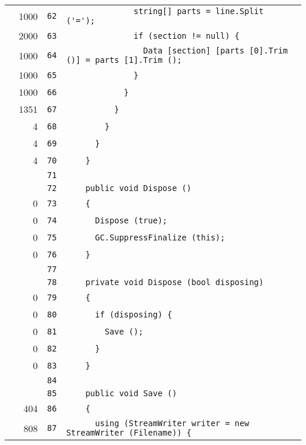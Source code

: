 \documentclass[a4paper,10pt]{article}
\begin{document}
\begin{longtable}[l]{lrrl}
\cellcolor{green} & 1000 & \verb~62~ & \verb~              string[] parts = line.Split ('=');~\\
\cellcolor{green} & 2000 & \verb~63~ & \verb~              if (section != null) {~\\
\cellcolor{green} & 1000 & \verb~64~ & \verb~                Data [section] [parts [0].Trim ()] = parts [1].Trim ();~\\
\cellcolor{green} & 1000 & \verb~65~ & \verb~              }~\\
\cellcolor{green} & 1000 & \verb~66~ & \verb~            }~\\
\cellcolor{green} & 1351 & \verb~67~ & \verb~          }~\\
\cellcolor{green} & 4 & \verb~68~ & \verb~        }~\\
\cellcolor{green} & 4 & \verb~69~ & \verb~      }~\\
\cellcolor{green} & 4 & \verb~70~ & \verb~    }~\\
\cellcolor{gray} &  & \verb~71~ & \verb~~\\
\cellcolor{gray} &  & \verb~72~ & \verb~    public void Dispose ()~\\
\cellcolor{red} & 0 & \verb~73~ & \verb~    {~\\
\cellcolor{red} & 0 & \verb~74~ & \verb~      Dispose (true);~\\
\cellcolor{red} & 0 & \verb~75~ & \verb~      GC.SuppressFinalize (this);~\\
\cellcolor{red} & 0 & \verb~76~ & \verb~    }~\\
\cellcolor{gray} &  & \verb~77~ & \verb~~\\
\cellcolor{gray} &  & \verb~78~ & \verb~    private void Dispose (bool disposing)~\\
\cellcolor{red} & 0 & \verb~79~ & \verb~    {~\\
\cellcolor{red} & 0 & \verb~80~ & \verb~      if (disposing) {~\\
\cellcolor{red} & 0 & \verb~81~ & \verb~        Save ();~\\
\cellcolor{red} & 0 & \verb~82~ & \verb~      }~\\
\cellcolor{red} & 0 & \verb~83~ & \verb~    }~\\
\cellcolor{gray} &  & \verb~84~ & \verb~~\\
\cellcolor{gray} &  & \verb~85~ & \verb~    public void Save ()~\\
\cellcolor{green} & 404 & \verb~86~ & \verb~    {~\\
\cellcolor{green} & 808 & \verb~87~ & \verb~      using (StreamWriter writer = new StreamWriter (Filename)) {~\\

\end{longtable}
\end{document}
